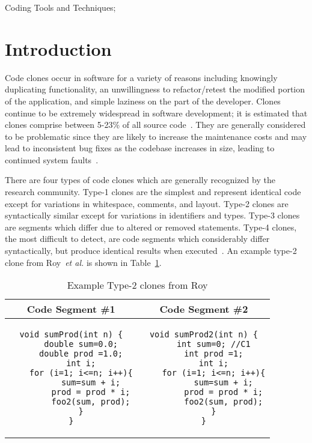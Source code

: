 \documentclass{sig-alternate}
\begin{document}
Coding Tools and Techniques;


\section{Introduction}
Code clones occur in software for a variety of reasons including knowingly duplicating functionality, an unwillingness to refactor/retest the modified portion of the application, and simple laziness on the part of the developer. Clones continue to be extremely widespread in software development; it is estimated that clones comprise between 5-23\% of all source code~\cite{738528,Schulze:2010:CCF:1868294.1868310}. They are generally considered to be problematic since they are likely to increase the maintenance costs and may lead to inconsistent bug fixes as the codebase increases in size, leading to continued system faults~\cite{Deissenboeck:2010:CCD:1810295.1810449}.

There are four types of code clones which are generally recognized by the research community. Type-1 clones are the simplest and represent identical code except for variations in whitespace, comments, and layout. Type-2 clones are syntactically similar except for variations in identifiers and types. Type-3 clones are segments which differ due to altered or removed statements. Type-4 clones, the most difficult to detect, are code segments which considerably differ syntactically, but produce identical results when executed~\cite{Gold:2010:ICC:1808901.1808916}. An example type-2 clone from Roy~\emph{et al.}\cite{Roy:2009:CEC:1530898.1531101} is shown in Table~\ref{table:royclones}.

\noindent
\begin{table}
\centering
\begin{tabular}{c | c}
\bfseries Code Segment \#1  & \bfseries Code Segment \#2 \\ \hline \hline
\begin{lstlisting}
void sumProd(int n) {
	double sum=0.0;
	double prod =1.0;
	int i;
	for (i=1; i<=n; i++){
		sum=sum + i;
		prod = prod * i;
		foo2(sum, prod);
	}
}
\end{lstlisting}
&
\begin{lstlisting}
void sumProd2(int n) {
	int sum=0; //C1
	int prod =1;
	int i;
	for (i=1; i<=n; i++){
		sum=sum + i;
		prod = prod * i;
		foo2(sum, prod);
	}
}
\end{lstlisting}

\end{tabular}
\caption{Example Type-2 clones from Roy}
\label{table:royclones}
\end{table}
\end{document}
